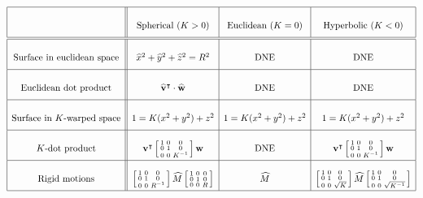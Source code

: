\documentclass[newpage,hints,handout,noauthor,nooutcomes,12pt]{ximera}
\begin{document}
\[
  {\renewcommand{\arraystretch}{2.7}
  \begin{array}{|c||c|c|c|}\hline
    & \text{Spherical (}K>0) & \text{Euclidean (}K=0) & \text{Hyperbolic (}K<0)\\
    \hline\hline
    \text{Surface in euclidean space}
    & \hat{x}^{2}+\hat{y}^{2}+\hat{z}^{2}=R^{2} & \text{DNE}  & \text{DNE} \\\hline
    \text{Euclidean dot product} & \hat{\mathbf v}^\transpose\cdot \hat{\mathbf w}
                             & \text{DNE}  & \text{DNE}\\\hline
    \text{Surface in $K$-warped space}
    & {1=K(x^{2}+y^{2})+z^{2}} & 1=K(x^{2}+y^{2})+z^{2} & 1=K(x^{2}+y^{2})+z^{2}\\\hline
    K\text{-dot product}
    & \mathbf v^\transpose \left[\begin{smallmatrix}
        1 & 0 & 0\\
        0 & 1 & 0\\
        0 & 0 & K^{-1}
      \end{smallmatrix}\right] \mathbf w &  \text{DNE}
    & \mathbf{v}^\transpose \left[\begin{smallmatrix}1 & 0 & 0\\ 0 & 1 & 0\\ 0 & 0 & K^{-1}\end{smallmatrix}\right]\mathbf w \\\hline
    \text{Rigid motions} &  \left[\begin{smallmatrix}1 & 0 & 0\\ 0 & 1 & 0\\ 0 & 0 & R^{-1}\end{smallmatrix}\right] \hat M \left[\begin{smallmatrix}1 & 0 & 0\\ 0 & 1 & 0\\ 0 & 0 & R\end{smallmatrix}\right] & \hat M & \left[\begin{smallmatrix}1 & 0 & 0\\ 0 & 1 & 0\\ 0 & 0 & \sqrt{K}\end{smallmatrix}\right] \hat M \left[\begin{smallmatrix}1 & 0 & 0\\ 0 & 1 & 0\\ 0 & 0 & \sqrt{K^{-1}}\end{smallmatrix}\right] \\\hline
\end{array}}
\]
\end{document}
